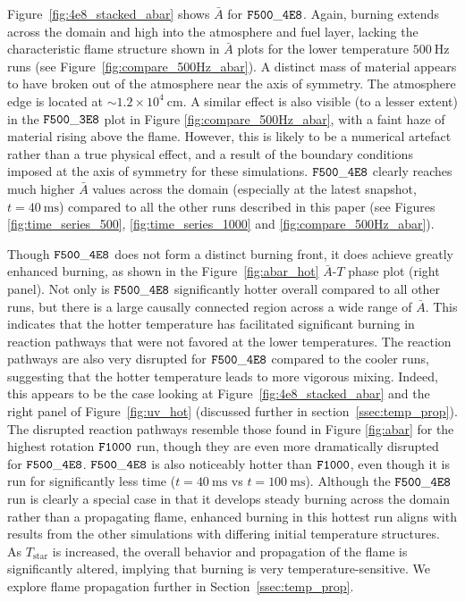 \documentclass[preprint,times,tighten]{aastex63}
\begin{document}
Figure~\ref{fig:4e8_stacked_abar} shows $\bar{A}$ for $\tt{F500\_4E8}$. Again, burning extends 
across the domain and high into the atmosphere and fuel layer, lacking the characteristic flame 
structure shown in $\bar{A}$ plots for the lower temperature $500~\mathrm{Hz}$ runs (see 
Figure~\ref{fig:compare_500Hz_abar}). A distinct mass of material appears to have broken out of the 
atmosphere near the axis of symmetry. The atmosphere edge is located at $\sim 1.2\times 
10^4~\mathrm{cm}$. A similar effect is also visible (to a lesser extent) in the $\tt{F500\_3E8}$ 
plot in Figure \ref{fig:compare_500Hz_abar}, with a faint haze of material rising above the flame. 
However, this is likely to be a numerical artefact rather than a true physical effect, and a result 
of the boundary conditions imposed at the axis of symmetry for these simulations. $\tt{F500\_4E8}$ 
clearly reaches much higher $\bar{A}$ values across the domain (especially at the latest snapshot, 
$t = 40~\mathrm{ms}$) compared to all the other runs described in this paper (see Figures 
\ref{fig:time_series_500}, \ref{fig:time_series_1000} and \ref{fig:compare_500Hz_abar}). 


 Though $\tt{F500\_4E8}$ does not form a distinct burning front, it does achieve greatly enhanced burning, as shown in the Figure~\ref{fig:abar_hot} $\bar{A}$-$T$ phase plot (right panel). Not only is $\tt{F500\_4E8}$ significantly hotter overall compared to all other runs, but there is a large causally connected region across a wide range of $\bar{A}$. This indicates that the hotter temperature has facilitated significant burning in reaction pathways that were not favored at the lower temperatures. The reaction pathways are also very disrupted for $\tt{F500\_4E8}$ compared to the cooler runs, suggesting that the hotter temperature leads to more vigorous mixing. Indeed, this appears to be the case looking at Figure~\ref{fig:4e8_stacked_abar} and the right panel of Figure~\ref{fig:uv_hot} (discussed further in section~\ref{ssec:temp_prop}). The disrupted reaction pathways resemble those found in Figure \ref{fig:abar} for the highest rotation $\tt{F1000}$ run, though they are even more dramatically disrupted for $\tt{F500\_4E8}$. $\tt{F500\_4E8}$ is also noticeably hotter than $\tt{F1000}$, even though it is run for significantly less time ($t = 40~\mathrm{ms}$ vs $t = 100~\mathrm{ms}$). Although the $\tt{F500\_4E8}$ run is clearly a special case in that it develops steady burning across the domain rather than a propagating flame, enhanced burning in this hottest run aligns with results from the other simulations with differing initial temperature structures. As $T_{\mathrm{star}}$ is increased, the overall behavior and propagation of the flame is significantly altered, implying that burning is very temperature-sensitive. We explore flame propagation further in Section~\ref{ssec:temp_prop}.
\end{document}
